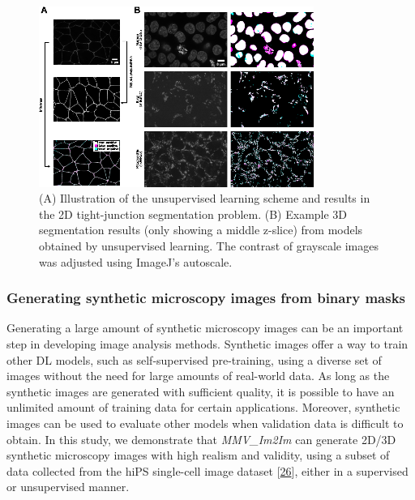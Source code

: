 \begin{figure}
\hypertarget{fig:unsupervised}{%
\centering
\includegraphics[width=0.8\textwidth,height=\textheight]{images/unsupervised_seg_justin.png}
\caption{(A) Illustration of the unsupervised learning scheme and results in the 2D tight-junction segmentation problem. (B) Example 3D segmentation results (only showing a middle z-slice) from models obtained by unsupervised learning. The contrast of grayscale images was adjusted using ImageJ's autoscale.}\label{fig:unsupervised}
}
\end{figure}

\hypertarget{generating-synthetic-microscopy-images-from-binary-masks}{%
\subsubsection{Generating synthetic microscopy images from binary masks}\label{generating-synthetic-microscopy-images-from-binary-masks}}

Generating a large amount of synthetic microscopy images can be an important step in developing image analysis methods. Synthetic images offer a way to train other DL models, such as self-supervised pre-training, using a diverse set of images without the need for large amounts of real-world data. As long as the synthetic images are generated with sufficient quality, it is possible to have an unlimited amount of training data for certain applications. Moreover, synthetic images can be used to evaluate other models when validation data is difficult to obtain. In this study, we demonstrate that \emph{MMV\_Im2Im} can generate 2D/3D synthetic microscopy images with high realism and validity, using a subset of data collected from the hiPS single-cell image dataset {[}\protect\hyperlink{ref-5sGcmDuy}{26}{]}, either in a supervised or unsupervised manner.

